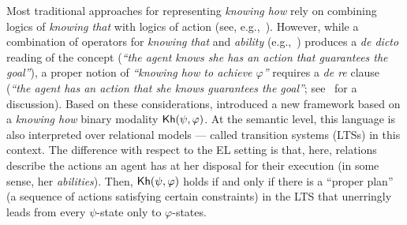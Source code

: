 Most traditional approaches for representing \emph{knowing how} rely on combining logics of \emph{knowing that} with logics of action (see, e.g.,~\cite{Mccarthy69,Les00,HerzigT06}). However, while a combination of operators for \emph{knowing that} and \emph{ability} (e.g.,~\cite{wiebeetal:2003}) produces a \emph{de dicto} reading of the concept (\emph{``the agent knows she has an action that guarantees the goal''}), a proper notion of \emph{``knowing how to achieve $\varphi$''} requires a \emph{de re} clause (\emph{``the agent has an action that she knows guarantees the goal''}; see~\cite{JamrogaA07,Herzig15} for a discussion). Based on these considerations, \cite{Wang15lori,Wang2016} introduced a new framework based on a \emph{knowing how} binary modality ${\sf Kh}(\psi,\varphi)$. At the semantic level, this language is also interpreted over relational models --- called transition systems (LTSs) in this context. The difference with respect to the EL setting is that, here, relations describe the actions an agent has at her disposal for their execution (in some sense, her \emph{abilities}).
Then, ${\sf Kh}(\psi,\varphi)$ holds if and only if there is a ``proper plan'' (a sequence of actions satisfying certain constraints) in the LTS that unerringly leads from every $\psi$-state only to $\varphi$-states.


